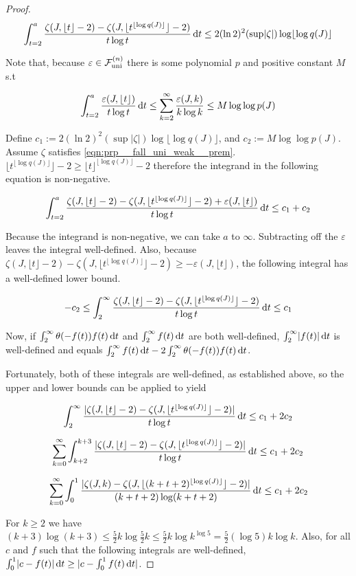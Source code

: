\documentclass[11pt]{article}
\numberwithin{equation}{section}
\theoremstyle{definition}
\theoremstyle{plain}
\newcommand{\Abs}[1]{\lvert #1 \rvert}
\newcommand{\Floor}[1]{\lfloor #1 \rfloor}
\newcommand{\Fall}{\mathcal{F}}
\newcommand{\FallU}{{\Fall_{\textnormal{uni}}^{(n)}}}
\begin{document}
\begin{proof}
\[\int_{t = 2}^{a} \frac{\zeta(J,\Floor{t}-2) - \zeta(J,\Floor{t^{\Floor{\log q(J)}}}-2)}{t \log t} \dif t \leq 2(\ln 2)^2(\sup \Abs{\zeta}) \log \Floor{\log q(J)}\]

Note that, because $\varepsilon\in\FallU$ there is some polynomial $p$ and positive constant $M$ s.t

\[\int_{t=2}^{a} \frac{\varepsilon(J,\Floor{t})}{t \log t}\dif t \le \sum_{k=2}^{\infty}\frac{\varepsilon(J,k)}{k \log k}\le M\log\log p(J)\]

Define $c_{1}:=2(\ln 2)^2(\sup \Abs{\zeta}) \log \Floor{\log q(J)}$, and $c_{2}:=M\log\log p(J)$. Assume ${\zeta}$ satisfies \ref{eqn:prp__fall_uni_weak__prem}. ${\Floor{t^{\Floor{\log q(J)}}}-2 \geq \Floor{t}^{\Floor{\log q(J)}}-2}$ therefore the integrand in the following equation is non-negative.

\[\int_{t = 2}^{a} \frac{\zeta(J,\Floor{t}-2) - \zeta(J,\Floor{t^{\Floor{\log q(J)}}}-2)+\varepsilon(J,\Floor{t})}{t \log t} \dif t \leq c_{1}+c_{2}\]

Because the integrand is non-negative, we can take $a$ to $\infty$. Subtracting off the $\varepsilon$ leaves the integral well-defined. Also, because $\zeta(J,\Floor{t}-2) - \zeta(J,\Floor{t^{\Floor{\log q(J)}}}-2)\ge -\varepsilon(J,\Floor{t})$, the following integral has a well-defined lower bound. 

\[-c_{2}\leq\int_2^\infty \frac{\zeta(J,\Floor{t}-2) - \zeta(J,\Floor{t^{\Floor{\log q(J)}}}-2)}{t \log t} \dif t \leq c_{1}\]

Now, if $\int_2^\infty \theta(-f(t))f(t)\dif t$ and $\int_2^\infty f(t)\dif t$ are both well-defined, $\int_{2}^{\infty}\Abs{f(t)}\dif t$ is well-defined and equals $\int_2^\infty f(t)\dif t - 2\int_2^\infty \theta(-f(t))f(t)\dif t$.

Fortunately, both of these integrals are well-defined, as established above, so the upper and lower bounds can be applied to yield

\[\int_2^\infty \frac{\Abs{\zeta(J,\Floor{t}-2) - \zeta(J,\Floor{t^{\Floor{\log q(J)}}}-2)}}{t \log t} \dif t \leq c_{1}+2c_{2}\]

\[\sum_{k=0}^\infty \int_{k+2}^{k+3} \frac{\Abs{\zeta(J,\Floor{t}-2) - \zeta(J,\Floor{t^{\Floor{\log q(J)}}}-2)}}{t \log t} \dif t \leq c_{1}+2c_{2}\]

\[\sum_{k=0}^\infty \int_0^1 \frac{\Abs{\zeta(J,k) - \zeta(J,\Floor{(k+t+2)^{\Floor{\log q(J)}}}-2)}}{(k+t+2) \log (k+t+2)}\dif t \leq c_{1}+2c_{2}\]

For ${k \geq 2}$ we have ${(k + 3) \log (k + 3) \leq \frac{5}{2}k \log \frac{5}{2}k \leq \frac{5}{2}k \log k^{\log 5} = \frac{5}{2} (\log 5) k \log k}$. Also, for all $c$ and $f$ such that the following integrals are well-defined, $\int_0^1 \Abs{c-f(t)}\dif t\ge\Abs{c-\int_0^1 f(t)\dif t}$.


\end{proof}
\end{document}
